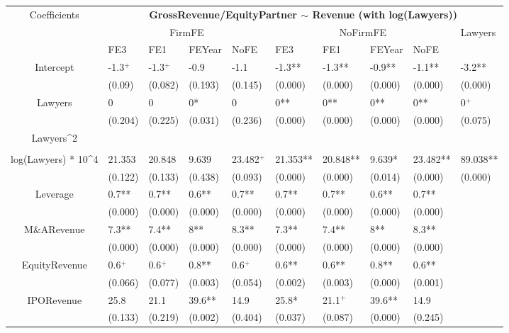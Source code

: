 \documentclass{article}
\begin{document}
\begin{table}[H]
\centering
\begin{tabular}{|clllllllll|}
\hline
\multirow{3}{*}{Coefficients} & \multicolumn{9}{c|}{\textbf{GrossRevenue/EquityPartner $\sim$ Revenue (with log(Lawyers))}} \\
\cline{2-10}
& \multicolumn{4}{c}{FirmFE} & \multicolumn{4}{c}{NoFirmFE} & \multirow{2}{*}{Lawyers} \\
\cline{2-9}
& FE3 & FE1 & FEYear & NoFE & FE3 & FE1 & FEYear & NoFE &  \\
\hline
 
Intercept & -1.3$^{+}$ & -1.3$^{+}$ & -0.9 & -1.1 & -1.3** & -1.3** & -0.9** & -1.1** & -3.2** \\ 
   & (0.09) & (0.082) & (0.193) & (0.145) & (0.000) & (0.000) & (0.000) & (0.000) & (0.000) \\ 
  Lawyers & 0 & 0 & 0* & 0 & 0** & 0** & 0** & 0** & 0$^{+}$ \\ 
   & (0.204) & (0.225) & (0.031) & (0.236) & (0.000) & (0.000) & (0.000) & (0.000) & (0.075) \\ 
  Lawyers^2 &  &  &  &  &  &  &  &  &  \\ 
   &  &  &  &  &  &  &  &  &  \\ 
  log(Lawyers) * 10^4 & 21.353 & 20.848 & 9.639 & 23.482$^{+}$ & 21.353** & 20.848** & 9.639* & 23.482** & 89.038** \\ 
   & (0.122) & (0.133) & (0.438) & (0.093) & (0.000) & (0.000) & (0.014) & (0.000) & (0.000) \\ 
  Leverage & 0.7** & 0.7** & 0.6** & 0.7** & 0.7** & 0.7** & 0.6** & 0.7** &  \\ 
   & (0.000) & (0.000) & (0.000) & (0.000) & (0.000) & (0.000) & (0.000) & (0.000) &  \\ 
  M\&ARevenue & 7.3** & 7.4** & 8** & 8.3** & 7.3** & 7.4** & 8** & 8.3** &  \\ 
   & (0.000) & (0.000) & (0.000) & (0.000) & (0.000) & (0.000) & (0.000) & (0.000) &  \\ 
  EquityRevenue & 0.6$^{+}$ & 0.6$^{+}$ & 0.8** & 0.6$^{+}$ & 0.6** & 0.6** & 0.8** & 0.6** &  \\ 
   & (0.066) & (0.077) & (0.003) & (0.054) & (0.002) & (0.003) & (0.000) & (0.001) &  \\ 
  IPORevenue & 25.8 & 21.1 & 39.6** & 14.9 & 25.8* & 21.1$^{+}$ & 39.6** & 14.9 &  \\ 
   & (0.133) & (0.219) & (0.002) & (0.404) & (0.037) & (0.087) & (0.000) & (0.245) &  \\ 

\end{tabular}
\end{table}
\end{document}
